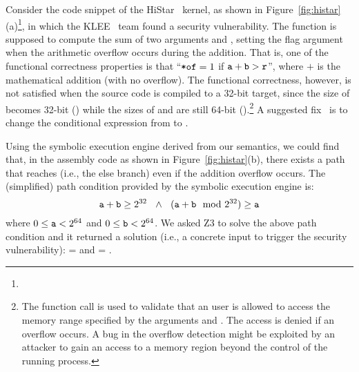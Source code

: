 

Consider the code snippet of the HiStar~\cite{HiStar:2006} kernel, as shown in Figure~\ref{fig:histar}(a)\footnote{}, in which the KLEE~\cite{Cadar:2008} team found a security vulnerability.
The  function is supposed to compute the sum of two arguments  and , setting the flag argument  when the arithmetic overflow occurs during the addition.
That is, one of the functional correctness properties is that ``$\texttt{*of} = 1$ if $\texttt{a} + \texttt{b} > \texttt{r}$'', where $+$ is the mathematical addition (with no overflow).
The functional correctness, however, is not satisfied when the source code is compiled to a 32-bit target,
since the size of  becomes 32-bit () while the sizes of  and  are still 64-bit ().\footnote{The function call  is used to validate that an user is allowed to access the memory range specified by the arguments  and .
The access is denied if an overflow occurs.
A bug in the overflow detection might be exploited by an attacker to gain an access to a memory region beyond the control of the running process.}
A suggested fix~\cite{Cadar:2008} is to change the conditional expression from  to .

Using the symbolic execution engine derived from our semantics, we could find  that, in the assembly code as shown in Figure~\ref{fig:histar}(b), there exists a path that reaches  (i.e., the else branch) even if the addition overflow occurs.
The (simplified) path condition provided by the symbolic execution engine is:
\[
\texttt{a} + \texttt{b} \ge 2^{32}
~~\wedge~~
(\texttt{a} + \texttt{b} \mod 2^{32}) \ge \texttt{a}
\]
where $0 \le \texttt{a} < 2^{64}$ and $0 \le \texttt{b} < 2^{64}$.
We asked Z3 to solve the above path condition and it returned a solution (i.e., a concrete input to trigger the security vulnerability):  =  and   = .




